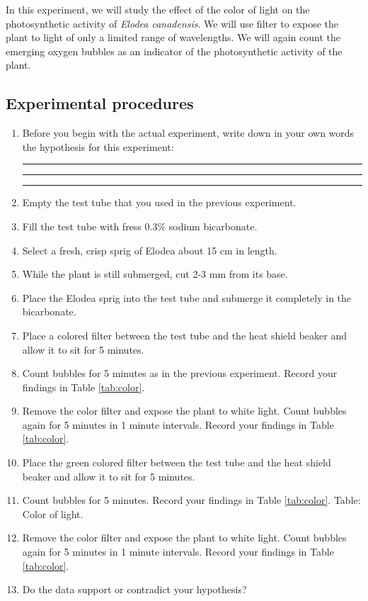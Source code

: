 In this experiment, we will study the effect of the color of light on
the photosynthetic activity of \emph{Elodea canadensis}. We will use
filter to expose the plant to light of only a limited range of
wavelengths. We will again count the emerging oxygen bubbles as an
indicator of the photosynthetic activity of the plant.

\subsection{Experimental procedures}\label{experimental-procedures-22}

\begin{enumerate}
\def\labelenumi{\arabic{enumi}.}
\item
  Before you begin with the actual experiment, write down in your own
  words the hypothesis for this experiment:

  \begin{center}\rule{0.5\linewidth}{\linethickness}\end{center}

  \begin{center}\rule{0.5\linewidth}{\linethickness}\end{center}

  \begin{center}\rule{0.5\linewidth}{\linethickness}\end{center}
\item
  Empty the test tube that you used in the previous experiment.
\item
  Fill the test tube with fress 0.3\% sodium bicarbonate.
\item
  Select a fresh, crisp sprig of Elodea about 15 cm in length.
\item
  While the plant is still submerged, cut 2-3 mm from its base.
\item
  Place the Elodea sprig into the test tube and submerge it completely
  in the bicarbonate.
\item
  Place a colored filter between the test tube and the heat shield
  beaker and allow it to sit for 5 minutes.
\item
  Count bubbles for 5 minutes as in the previous experiment. Record your
  findings in Table \ref{tab:color}.
\item
  Remove the color filter and expose the plant to white light. Count
  bubbles again for 5 minutes in 1 minute intervals. Record your
  findings in Table \ref{tab:color}.
\item
  Place the green colored filter between the test tube and the heat
  shield beaker and allow it to sit for 5 minutes.
\item
  Count bubbles for 5 minutes. Record your findings in Table
  \ref{tab:color}. Table: \label{tab:color} Color of light.
\item
  Remove the color filter and expose the plant to white light. Count
  bubbles again for 5 minutes in 1 minute intervals. Record your
  findings in Table \ref{tab:color}.
\item
  Do the data support or contradict your hypothesis?
\end{enumerate}

